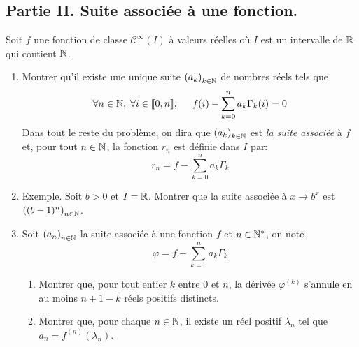 \subsection*{Partie II. Suite associée à une fonction.}
Soit $f$ une fonction de classe $\mathcal{C}^{\infty}(I)$ à valeurs réelles où $I$ est un intervalle de $\mathbb{R}$ qui contient $\mathbb{N}$.
\begin{enumerate}
 \item Montrer qu'il existe une unique suite $\left( a_k\right) _{k\in \mathbb{N}}$ de nombres réels tels que
\begin{displaymath}
 \forall n\in\mathbb{N},\; \forall i \in \llbracket 0, n\rrbracket,\hspace{0.5cm}f(i) - \sum_{k=0}^na_k\Gamma_k(i) = 0
\end{displaymath}
Dans tout le reste du problème, on dira que $\left( a_k\right) _{k\in \mathbb{N}}$ est \emph{la suite associée} à $f$ et, pour tout $n\in \mathbb{N}$, la fonction $r_n$ est définie dans $I$ par:
\begin{displaymath}
 r_n = f - \sum_{k=0}^na_k\Gamma_k
\end{displaymath}


\item Exemple. Soit $b>0$ et $I=\mathbb{R}$. Montrer que la suite associée à $x \rightarrow b^x$ est $\left( (b-1)^n\right)_{n\in \mathbb{N}}$.

\item Soit $\left( a_n\right) _{n\in \mathbb{N}}$ la suite associée à une fonction $f$ et $n\in \mathbb{N}^*$, on note
\begin{displaymath}
 \varphi = f - \sum_{k=0}^{n}a_k \Gamma_k
\end{displaymath}
\begin{enumerate}
 \item Montrer que, pour tout entier $k$ entre $0$ et $n$, la dérivée $\varphi^{(k)}$ s'annule en au moins $n+1-k$ réels positifs distincts.
 \item Montrer que, pour chaque $n\in \mathbb{N}$, il existe un réel positif $\lambda_n$ tel que $a_n = f^{(n)}(\lambda_n)$. 
\end{enumerate}

\end{enumerate}

